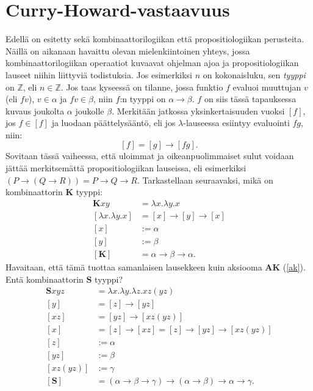 \documentclass[a4paper,12pt]{amsart}
\begin{document}
\section{Curry-Howard-vastaavuus}
Edellä on esitetty sekä kombinaattorilogiikan että propositiologiikan perusteita. Näillä on aikanaan havaittu olevan mielenkiintoinen yhteys, jossa kombinaattorilogiikan operaatiot kuvaavat ohjelman ajoa ja propositiologiikan lauseet niihin liittyviä todistuksia. Jos esimerkiksi $n$ on kokonaisluku, sen \emph{tyyppi} on $\mathbb{Z}$, eli $n\in\mathbb{Z}$. Jos taas kyseessä on tilanne, jossa funktio $f$ evaluoi muuttujan $v$ (eli $fv$), $v\in\alpha$ ja $fv\in\beta$, niin $f$:n tyyppi on $\alpha\to\beta$. $f$ on siis tässä tapauksessa kuvaus joukolta $\alpha$ joukolle $\beta$. Merkitään jatkossa yksinkertaisuuden vuoksi $[f]$, jos $f\in[f]$ ja luodaan päättelysääntö, eli jos $\lambda$-lauseessa esiintyy evaluointi $fg$, niin:
$$
[f]=[g]\to[fg].
$$
Sovitaan tässä vaiheessa, että uloimmat ja oikeanpuolimmaiset sulut voidaan jättää merkitsemättä propositiologiikan lauseissa, eli esimerkiksi $(P\to (Q\to R))=P\to Q\to R$. Tarkastellaan seuraavaksi, mikä on kombinaattorin $\mathbf{K}$ tyyppi:
\begin{equation}\label{akjohto}
\begin{split}
\mathbf{K}xy &= \lambda x.\lambda y.x \\
[\lambda x.\lambda y.x] &= [x]\to[y]\to[x] \\
[x] &:= \alpha \\
[y] &:= \beta \\
[\mathbf{K}] &= \alpha\to\beta\to\alpha.
\end{split}
\end{equation}
Havaitaan, että tämä tuottaa samanlaisen lausekkeen kuin aksiooma $\mathbf{AK}$ (\ref{ak}). Entä kombinaattorin $\mathbf{S}$ tyyppi?
\begin{equation}\label{asjohto}
\begin{split}
\mathbf{S}xyz &= \lambda x.\lambda y.\lambda z.xz(yz) \\
[y] &= [z]\to[yz] \\
[xz] &= [yz]\to[xz(yz)] \\
[x] &= [z]\to[xz] = [z]\to[yz]\to[xz(yz)] \\
[z] &:= \alpha \\
[yz] &:= \beta \\
[xz(yz)] &:= \gamma \\
[\mathbf{S}] &= (\alpha\to\beta\to\gamma)\to(\alpha\to\beta)\to\alpha\to\gamma.
\end{split}
\end{equation}
\end{document}
